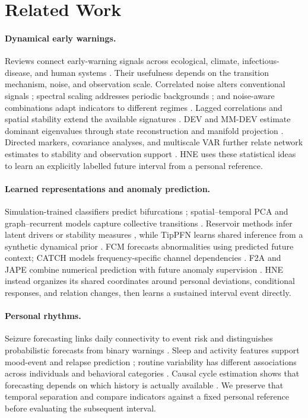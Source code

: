 \section{Related Work}
\label{sec:related-work}

\paragraph{Dynamical early warnings.}
Reviews connect early-warning signals across ecological, climate, infectious-disease, and human systems \citep{hneR01,hneR02,hneR03}. Their usefulness depends on the transition mechanism, noise, and observation scale. Correlated noise alters conventional signals \citep{hneM03}; spectral scaling addresses periodic backgrounds \citep{hneM14}; and noise-aware combinations adapt indicators to different regimes \citep{hneM15}. Lagged correlations and spatial stability extend the available signatures \citep{hneM04,hneM05}. DEV and MM-DEV estimate dominant eigenvalues through state reconstruction and manifold projection \citep{hneM09,hneM10}. Directed markers, covariance analyses, and multiscale VAR further relate network estimates to stability and observation support \citep{hneM16,hneM17,hneM18}. HNE uses these statistical ideas to learn an explicitly labelled future interval from a personal reference.

\paragraph{Learned representations and anomaly prediction.}
Simulation-trained classifiers predict bifurcations \citep{hneM02}; spatial--temporal PCA and graph--recurrent models capture collective transitions \citep{hneM07,hneM08}. Reservoir methods infer latent drivers or stability measures \citep{hneM11,hneM13}, while TipPFN learns shared inference from a synthetic dynamical prior \citep{hneM12}. FCM forecasts abnormalities using predicted future context; CATCH models frequency-specific channel dependencies \citep{hneH01,hneC01}. F2A and JAPE combine numerical prediction with future anomaly supervision \citep{hneP01,hneP02}. HNE instead organizes its shared coordinates around personal deviations, conditional responses, and relation changes, then learns a sustained interval event directly.

\paragraph{Personal rhythms.}
Seizure forecasting links daily connectivity to event risk and distinguishes probabilistic forecasts from binary warnings \citep{hneA02,hneA03}. Sleep and activity features support mood-event and relapse prediction \citep{hneA08,hneA10}; routine variability has different associations across individuals and behavioral categories \citep{hneC02}. Causal cycle estimation shows that forecasting depends on which history is actually available \citep{hneA01}. We preserve that temporal separation and compare indicators against a fixed personal reference before evaluating the subsequent interval.
